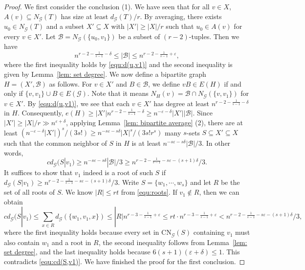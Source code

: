 \documentclass[11pt]{article}
\def\CN{\mathrm{CN}}
\begin{document}
\begin{proof}
We first consider the conclusion (1).
We have seen that for all $v\in X$, $A(v)\subseteq N_{\mathcal G}(T)$ has size at least $d_{\mathcal G}(T)/r$.
By averaging, there exists $u_0\in N_{\mathcal G}(T)$ and a subset $X'\subseteq X$ with $|X'|\ge |X|/r$ such that $u_0\in A(v)$ for every $v\in X'$.
Let $\mathcal B= N_{\mathcal G}(\{u_0,v_{1}\})$ be a subset of $(r-2)$-tuples.
Then we have $$n^{r-2-\frac{1}{s-1} -\delta}\le |\mathcal B|\le n^{r-2-\frac{1}{s-1}+ \varepsilon},$$
where the first inequality holds by \eqref{equ:d(u,v1)} and the second inequality is given by Lemma~\ref{lem: set degree}.
We now define a bipartite graph $H=(X',\mathcal B)$ as follows. For $v\in X'$ and $B\in \mathcal B$,
we define $vB\in E(H)$ if and only if $\{v,v_{1}\}\cup B\in E(\mathcal G)$.
Note that it means $N_H(v)=\mathcal B\cap N_\mathcal{G}(\{v,v_1\})$ for $v\in X'$.
By \eqref{equ:d(u,v1)}, we see that each $v\in X'$ has degree at least $n^{r-2-\frac{1}{s-1} -\delta}$ in $H$.
Consequently, $e(H)\ge |X'|n^{r-2-\frac{1}{s-1} -\delta}\ge n^{ -  \varepsilon -\delta}|X'||\mathcal B|$.
Since $|X'|\ge |X|/r\gg n^{\varepsilon +\delta}$, applying Lemma~\ref{lem: bipartite average} (2),
there are at least $(n^{-\varepsilon -\delta}|X'|)^s/(3s!)\geq n^{-s\varepsilon-s\delta }|X|^s/(3s!r^s)$ many $s$-sets $S\subseteq X'\subseteq X$ such that the common neighbor of $S$ in $H$ is at least $n^{-s\varepsilon- s\delta }|\mathcal B|/3.$
In other words,
\begin{equation}\label{equ:cd(S,v1)}
cd_{\mathcal G}(S|v_{ 1})\ge  n^{ -s\varepsilon-s\delta}|\mathcal B|/3 \ge n^{r-2-\frac{1}{s-1} -s\varepsilon-(s+1)\delta}/3.
\end{equation}
It suffices to show that $v_{1}$ indeed is a root of such $S$ if $d_{\mathcal G}(S|v_{ 1})\ge n^{r-2-\frac{1}{s-1} -s\varepsilon-(s+1)\delta}/3$.
Write $S=\{w_1,\cdots,w_s\}$ and let $R$ be the set of all roots of $S$.
We know $|R|\leq rt$ from \eqref{equ:roots}.
If $v_1\notin R$, then we can obtain
$$cd_{\mathcal G}(S|v_{1})\le \sum_{x\in R}d_\mathcal{G}(\{w_1,v_1,x\})\le |R|n^{r-3-\frac{1}{s-1} +\varepsilon} \le rt\cdot n^{r-3-\frac{1}{s-1} +\varepsilon}<n^{r-2-\frac{1}{s-1} -s\varepsilon-(s+1)\delta}/3,$$
where the first inequality holds because every set in $\CN_{\mathcal G}(S)$ containing $v_1$ must also contain $w_1$ and a root in $R$,
the second inequality follows from Lemma~\ref{lem: set degree}, and the last inequality holds because $6(s+1)(\varepsilon + \delta)\le 1$.
This contradicts \eqref{equ:cd(S,v1)}. We have finished the proof for the first conclusion.


\end{proof}
\end{document}
